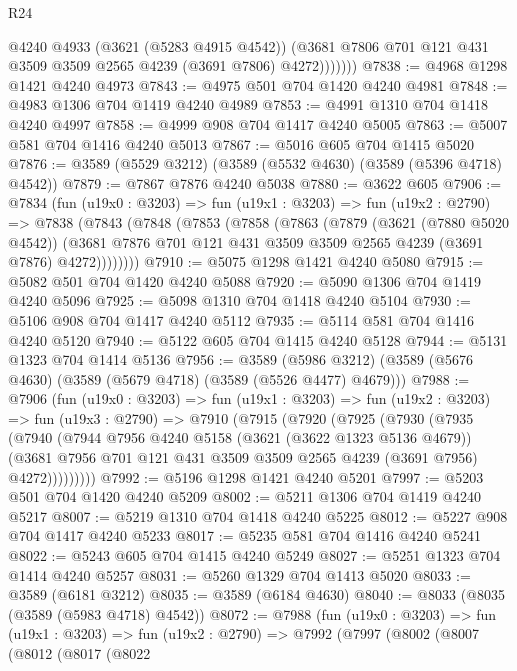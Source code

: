 \begin{lexlean}{R24}
\begin{coremodule}
                @4240
                @4933
                (@3621 (@5283 @4915 @4542))
                (@3681 @7806 @701 @121 @431 @3509 @3509 @2565 @4239 (@3691 @7806) @4272)))))))
@7838 := @4968 @1298 @1421 @4240 @4973
@7843 := @4975 @501 @704 @1420 @4240 @4981
@7848 := @4983 @1306 @704 @1419 @4240 @4989
@7853 := @4991 @1310 @704 @1418 @4240 @4997
@7858 := @4999 @908 @704 @1417 @4240 @5005
@7863 := @5007 @581 @704 @1416 @4240 @5013
@7867 := @5016 @605 @704 @1415 @5020
@7876 := @3589 (@5529 @3212) (@3589 (@5532 @4630) (@3589 (@5396 @4718) @4542))
@7879 := @7867 @7876 @4240 @5038
@7880 := @3622 @605
@7906 := @7834
    (fun (u19x0 : @3203) =>
    fun (u19x1 : @3203) =>
    fun (u19x2 : @2790) =>
    @7838
      (@7843
        (@7848
          (@7853
            (@7858
              (@7863
                (@7879
                  (@3621 (@7880 @5020 @4542))
                  (@3681 @7876 @701 @121 @431 @3509 @3509 @2565 @4239 (@3691 @7876) @4272))))))))
@7910 := @5075 @1298 @1421 @4240 @5080
@7915 := @5082 @501 @704 @1420 @4240 @5088
@7920 := @5090 @1306 @704 @1419 @4240 @5096
@7925 := @5098 @1310 @704 @1418 @4240 @5104
@7930 := @5106 @908 @704 @1417 @4240 @5112
@7935 := @5114 @581 @704 @1416 @4240 @5120
@7940 := @5122 @605 @704 @1415 @4240 @5128
@7944 := @5131 @1323 @704 @1414 @5136
@7956 := @3589 (@5986 @3212) (@3589 (@5676 @4630) (@3589 (@5679 @4718) (@3589 (@5526 @4477) @4679)))
@7988 := @7906
    (fun (u19x0 : @3203) =>
    fun (u19x1 : @3203) =>
    fun (u19x2 : @3203) =>
    fun (u19x3 : @2790) =>
    @7910
      (@7915
        (@7920
          (@7925
            (@7930
              (@7935
                (@7940
                  (@7944
                    @7956
                    @4240
                    @5158
                    (@3621 (@3622 @1323 @5136 @4679))
                    (@3681 @7956 @701 @121 @431 @3509 @3509 @2565 @4239 (@3691 @7956) @4272)))))))))
@7992 := @5196 @1298 @1421 @4240 @5201
@7997 := @5203 @501 @704 @1420 @4240 @5209
@8002 := @5211 @1306 @704 @1419 @4240 @5217
@8007 := @5219 @1310 @704 @1418 @4240 @5225
@8012 := @5227 @908 @704 @1417 @4240 @5233
@8017 := @5235 @581 @704 @1416 @4240 @5241
@8022 := @5243 @605 @704 @1415 @4240 @5249
@8027 := @5251 @1323 @704 @1414 @4240 @5257
@8031 := @5260 @1329 @704 @1413 @5020
@8033 := @3589 (@6181 @3212)
@8035 := @3589 (@6184 @4630)
@8040 := @8033 (@8035 (@3589 (@5983 @4718) @4542))
@8072 := @7988
    (fun (u19x0 : @3203) =>
    fun (u19x1 : @3203) =>
    fun (u19x2 : @2790) =>
    @7992
      (@7997
        (@8002
          (@8007
            (@8012
              (@8017
                (@8022

\end{coremodule}
\end{lexlean}
